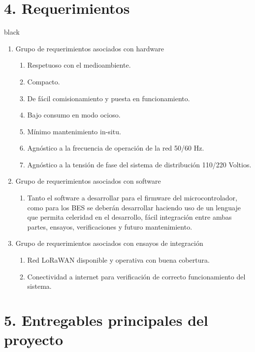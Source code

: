 \documentclass[11pt]{charter}
\begin{document}
\section{4. Requerimientos}
\label{sec:requerimientos}
\begin{consigna}{black}
\begin{enumerate}
\item Grupo de requerimientos asociados con hardware
	\begin{enumerate}
	\item Respetuoso con el medioambiente.
	\item Compacto.
	\item De fácil comisionamiento y puesta en funcionamiento.
	\item Bajo consumo en modo ocioso.
	\item Mínimo mantenimiento in-situ.
	\item Agnóstico a la frecuencia de operación de la red 50/60 Hz.
	\item Agnóstico a la tensión de fase del sistema de distribución 110/220 Voltios.
	\end{enumerate}
\item Grupo de requerimientos asociados con software
	\begin{enumerate}
	\item Tanto el software a desarrollar para el firmware del microcontrolador, como para los BES se deberán desarrollar haciendo uso de un lenguaje que permita celeridad en el desarrollo, fácil integración entre ambas partes, ensayos, verificaciones y futuro mantenimiento.
	\end{enumerate}
\item Grupo de requerimientos asociados con ensayos de integración
\begin{enumerate}
	\item Red LoRaWAN disponible y operativa con buena cobertura.
	\item Conectividad a internet para verificación de correcto funcionamiento del sistema.
\end{enumerate}
\end{enumerate}


\end{consigna}

\section{5. Entregables principales del proyecto}
\label{sec:entregables}
\end{document}
